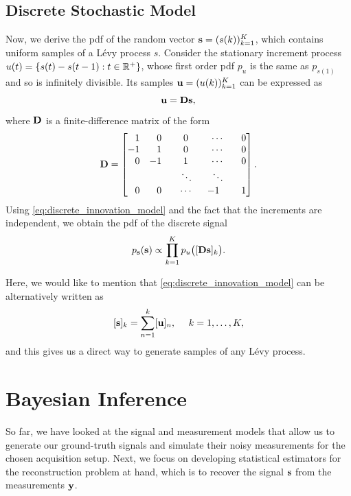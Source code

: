 \documentclass[journal]{IEEEtran}
\begin{document}
\subsection{Discrete Stochastic Model}
Now, we derive the pdf of the random vector ${\bf{s}} = (s(k))_{k=1}^{K}$, which contains uniform samples of a L\'{e}vy process $s$. Consider the stationary increment process $u(t) = \{s(t) - s(t-1) : t \in \mathbb{R}^{+} \}$, whose first order pdf $p_u$ is the same as $p_{s(1)}$ and so is infinitely divisible. Its samples ${\bf{u}} = (u(k))_{k=1}^{K}$ can be expressed as
\begin{equation}\label{eq:discrete_innovation_model}
    {\bf{u}} = {\bf{D}} {\bf{s}},
\end{equation}
where ${\bf{D}}$ is a finite-difference matrix of the form
\begin{equation}
    {\bf{D}} = \begin{bmatrix}
        \phantom{-}1 & \phantom{-}0 & \phantom{-}0  & \phantom{-}\cdots  & \phantom{-}0\\
        -1 & \phantom{-}1 & \phantom{-}0  & \phantom{-}\cdots  & \phantom{-}0\\
        \phantom{-}0 & -1 & \phantom{-}1  & \phantom{-}\cdots  & \phantom{-}0\\
         &  & \phantom{-}\ddots & \phantom{-}\ddots &  \\
         \phantom{-}0 & \phantom{-}0  & \phantom{-}\cdots & -1 & \phantom{-}1
    \end{bmatrix}.
\end{equation}
Using \eqref{eq:discrete_innovation_model} and the fact that the increments are independent, we obtain the pdf of the discrete signal
\begin{equation}\label{eq:discrete_pdf}
    p_{{\bf{s}}}({\bf{s}}) \propto \prod_{k = 1}^{K} p_{u}\big([{\bf{D}} {\bf{s}}]_k\big).
\end{equation}

Here, we would like to mention that \eqref{eq:discrete_innovation_model} can be alternatively written as
\begin{equation}\label{eq:gen_levy}
    [{\bf{s}}]_k = \sum_{n=1}^{k} [{\bf{u}}]_n, \ \ \ \ k = 1, \ldots, K,
\end{equation}
and this gives us a direct way to generate samples of any L\'{e}vy process.


\section{Bayesian Inference}
So far, we have looked at the signal and measurement models that allow us to generate our ground-truth signals and simulate their noisy measurements for the chosen acquisition setup. Next, we focus on developing statistical estimators for the reconstruction problem at hand, which is to recover the signal ${\bf{s}}$ from the measurements ${\bf{y}}$.
\end{document}
